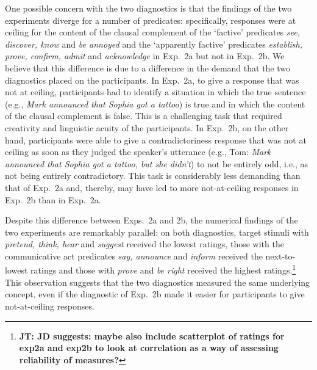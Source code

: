 \documentclass[11pt,fleqn]{article}
\newcommand{\6}{\mbox{$[\hspace*{-.6mm}[$}}
\newcommand{\9}{\mbox{$]\hspace*{-.6mm}]$}}
\newcommand{\jt}[1]{\textbf{\color{blue}JT: #1}}
\begin{document}
{One possible concern with the two diagnostics is that the findings of the two experiments diverge for a number of predicates: specifically, responses were at ceiling for the content of the clausal complement of the `factive' predicates {\em see, discover, know} and {\em be annoyed} and the `apparently factive' predicates {\em  establish, prove, confirm, admit} and {\em acknowledge} in Exp.~2a but not in Exp.~2b. We believe that this difference is due to a difference in the demand that the two diagnostics placed on the participants. In Exp.~2a, to give a response that was not at ceiling, participants had to identify a situation in which the true sentence (e.g., {\em Mark announced that Sophia got a tattoo}) is true and in which the content of the clausal complement is false. This is a challenging task that required creativity and linguistic acuity of the participants. In Exp.~2b, on the other hand, participants were able to give a contradictoriness response that was not at ceiling as soon as they judged the speaker's utterance (e.g., Tom: {\em Mark announced that Sophia got a tattoo, but she didn't}) to not be entirely odd, i.e., as not being entirely contradictory. This task is considerably less demanding than that of Exp.~2a and, thereby, may have led to more not-at-ceiling responses in Exp.~2b than in Exp.~2a.

Despite this difference between Exps.~2a and 2b, the numerical findings of the two experiments are remarkably parallel: on both diagnostics, target stimuli with {\em pretend, think, hear} and {\em suggest} received the lowest ratings, those with the communicative act predicates {\em say, announce} and {\em inform} received the next-to-lowest ratings and those with {\em prove} and {\em be right} received the highest ratings.\footnote{\jt{JD suggests: maybe also include scatterplot of ratings for exp2a and exp2b to look at correlation as a way of assessing reliability of measures?}
} This observation suggests that the two diagnostics measured the same underlying concept, even if the diagnostic of Exp.~2b made it easier for participants to give not-at-ceiling responses.  


%
%
%

}
\end{document}
